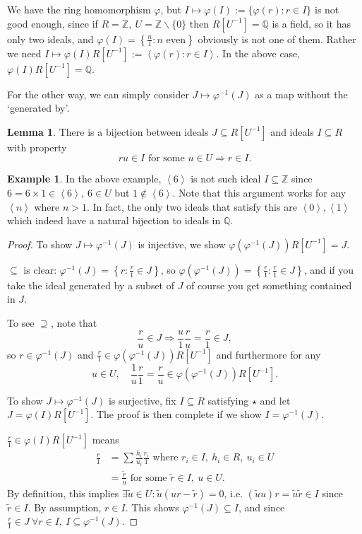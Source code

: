 \documentclass[a4paper]{article}
\newcommand{\la}{\left\langle}
\newcommand{\ra}{\right\rangle}
\newcommand{\Z}{\mathbb Z}
\newcommand{\Q}{\mathbb Q}
\theoremstyle{definition}
\newtheorem{lemma}[defn]{Lemma}
\newtheorem{example}[defn]{Example}
\begin{document}
We have the ring homomorphism $\varphi$, but $I\mapsto \varphi(I):=\{\varphi(r):r\in I\}$ is not good enough, since if $R=\Z,\ U=\Z\backslash\{0\}$ then $R[U^{-1}]=\Q$ is a field, so it has only two ideals, and $\varphi(I)=\left\{ \frac{n}{1}:n\text{ even} \right\}$ obviously is not one of them. Rather we need $I\mapsto \varphi(I)R[U^{-1}]:=\la \varphi(r):r\in I\ra$. In the above case, $\varphi(I)R[U^{-1}]=\Q$.

For the other way, we can simply consider $J\mapsto \varphi^{-1}(J)$ as a map without the `generated by'.

\begin{lemma}
There is a bijection between ideals $J\subseteq R[U^{-1}]$ and ideals $I\subseteq R$ with property
\[
\tag{$\star$}
ru\in I \text{ for some } u\in U\Rightarrow r\in I.
\]
\end{lemma}
\begin{example}
In the above example, $\la 6\ra$ is not such ideal $I\subseteq \Z$ since $6=6\times 1\in \la 6\ra,\ 6\in U$ but $1\notin\la 6\ra$. Note that this argument works for any $\la n\ra$ where $n>1$. In fact, the only two ideals that satisfy this are $\la 0\ra,\la 1\ra$ which indeed have a natural bijection to ideals in $\Q$.
\end{example}

\begin{proof}
To show $J\mapsto \varphi^{-1}(J)$ is injective, we show $\varphi(\varphi^{-1}(J))R[U^{-1}]=J$.

$\subseteq$ is clear: $\varphi^{-1}(J)=\left\{r:\frac{r}{1}\in J\right\}$, so $\varphi(\varphi^{-1}(J))=\left\{\frac{r}{1}:\frac{r}{1}\in J\right\}$, and if you take the ideal generated by a subset of $J$ of course you get something contained in $J$.

To see $\supseteq$, note that
\[
\frac{r}{u}\in J\Rightarrow \frac{u}{1}\frac{r}{u}=\frac{r}{1}\in J,
\]
so $r\in\varphi^{-1}(J)$ and $\frac{r}{1}\in \varphi(\varphi^{-1}(J))R[U^{-1}]$ and furthermore for any
\[
u\in U,\quad \frac{1}{u}\frac{r}{1}=\frac{r}{u}\in \varphi(\varphi^{-1}(J))R[U^{-1}].
\]

To show $J\mapsto \varphi^{-1}(J)$ is surjective, fix $I\subseteq R$ satisfying $\star$ and let $J=\varphi(I)R[U^{-1}]$. The proof is then complete if we show $I=\varphi^{-1}(J)$.

$\frac{r}{1}\in\varphi(I)R[U^{-1}]$ means
\[
\begin{aligned}
\frac{r}{1}&=\sum \frac{h_i}{u_i} \frac{r_i}{1} \text{ where } r_i\in I,\ h_i\in R,\ u_i\in U \\
&=\frac{\widetilde r}{u} \text{ for some } \widetilde r\in I,\ u\in U.
\end{aligned}
\]
By definition, this implies $\exists \widetilde u\in U:\widetilde u(ur-\widetilde r)=0$, i.e. $(\widetilde uu)r=\widetilde u\widetilde r \in I$ since $\widetilde r\in I$. By assumption, $r\in I$. This shows $\varphi^{-1}(J)\subseteq I$, and since $\frac{r}{1}\in J \ \forall r\in I,\ I\subseteq \varphi^{-1}(J)$.
\end{proof}
\end{document}
